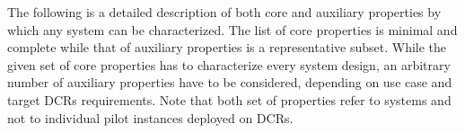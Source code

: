 \documentclass{sig-alternate}
\begin{document}

The following is a detailed description of both core and auxiliary properties by
which any \pilot system can be characterized. The list of core properties is
minimal and complete while that of auxiliary properties is a representative
subset. While the given set of core properties has to characterize every \pilot
system design, an arbitrary number of auxiliary properties have to be
considered, depending on use case and target DCRs requirements. Note that both
set of properties refer to \pilot systems and not to individual pilot instances
deployed on DCRs.






\end{document}
